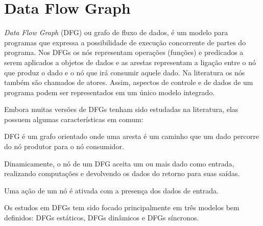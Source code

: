 
\chapter{Data Flow Graph}

\textit{Data Flow Graph} (DFG) ou grafo de fluxo de dados, é um modelo para 
programas que expressa a possibilidade de execução concorrente de partes do
programa. 
Nos DFGs os nós representam operações (funções) e predicados a serem
aplicados a objetos de dados e as arestas representam a ligação entre o nó que
produz o dado e o nó que irá consumir aquele dado.
Na literatura os nós também são chamados de atores.
Assim, aspectos de controle e de dados de um programa podem ser representados 
em um único modelo integrado.

Embora muitas versões de DFGs tenham sido estudadas na literatura, elas possuem 
algumas características em comum:

\begin{alineas}
        \item DFG é um grafo orientado onde uma aresta é um caminho que um dado
        percorre do nó produtor para o nó consumidor.
        \item Dinamicamente, o nó de um DFG aceita um ou mais dado como entrada,
        realizando computações e devolvendo os dados do retorno para suas
        saídas.
        \item Uma ação de um nó é ativada com a presença dos dados de entrada.
\end{alineas}

Os estudos em DFGs tem sido focado principalmente em três modelos bem definidos:
DFGs estáticos, DFGs dinâmicos e DFGs síncronos.



